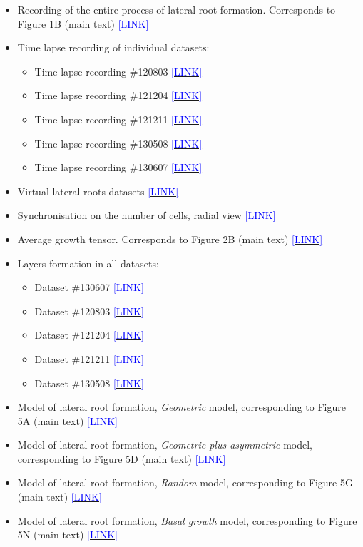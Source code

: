 \documentclass[11pt,a4paper, final]{article}
\begin{document}
\begin{itemize}
  \item Recording of the entire process of lateral root formation. Corresponds to Figure 1B (main text) \href{http://youtu.be/navcxqh7KCo}{\textcolor{blue}{[LINK]}}
  \item Time lapse recording of individual datasets:
  \begin{itemize}
  	\item Time lapse recording \#120803 \href{http://youtu.be/hvoDhoWLdSI}{\textcolor{blue}{[LINK]}}
    \item Time lapse recording \#121204 \href{http://youtu.be/bXf-gO8T0aQ}{\textcolor{blue}{[LINK]}}
    \item Time lapse recording \#121211 \href{http://youtu.be/ru7-g3KWV9E}{\textcolor{blue}{[LINK]}}
    \item Time lapse recording \#130508 \href{http://youtu.be/GApOwRMWmUU}{\textcolor{blue}{[LINK]}}
    \item Time lapse recording \#130607 \href{http://youtu.be/cFemfGbI5yA}{\textcolor{blue}{[LINK]}}
  \end{itemize}
  \item Virtual lateral roots datasets \href{http://youtu.be/EXIp3H0y5UI}{\textcolor{blue}{[LINK]}}
  \item Synchronisation on the number of cells, radial view \href{http://youtu.be/YZFkpcnyjiY}{\textcolor{blue}{[LINK]}}
  \item Average growth tensor. Corresponds to Figure 2B (main text) \href{https://youtu.be/unsGbA8-J-Y}{\textcolor{blue}{[LINK]}}
  \item Layers formation in all datasets:
  \begin{itemize}
    \item Dataset \#130607 \href{http://youtu.be/cdY3t1iVRF8}{\textcolor{blue}{[LINK]}}
    \item Dataset \#120803 \href{http://youtu.be/yXki6QpltZo}{\textcolor{blue}{[LINK]}}
    \item Dataset \#121204 \href{http://youtu.be/Bd_UgUVyzrM}{\textcolor{blue}{[LINK]}}
    \item Dataset \#121211 \href{http://youtu.be/NOouEVqpGj8}{\textcolor{blue}{[LINK]}}
    \item Dataset \#130508 \href{http://youtu.be/EajarNlRvtA}{\textcolor{blue}{[LINK]}}
  \end{itemize}		
  \item Model of lateral root formation, \emph{Geometric} model, corresponding to Figure 5A (main text) \href{https://youtu.be/GLUKCE4nN3A}{\textcolor{blue}{[LINK]}}
    \item Model of lateral root formation, \emph{Geometric plus asymmetric} model, corresponding to Figure 5D (main text) \href{https://youtu.be/ypBdyjFyqYw}{\textcolor{blue}{[LINK]}}
  \item Model of lateral root formation, \emph{Random} model, corresponding to Figure 5G (main text) \href{https://youtu.be/V9xkyPfRQeM}{\textcolor{blue}{[LINK]}}
  \item Model of lateral root formation, \emph{Basal growth} model, corresponding to Figure 5N (main text) \href{https://youtu.be/TZqwYTnmAgg}{\textcolor{blue}{[LINK]}}


\end{itemize}
\end{document}
